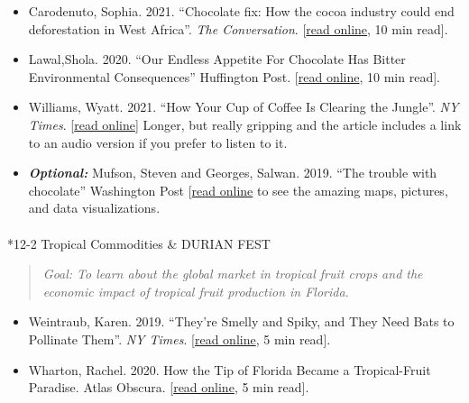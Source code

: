 \documentclass[
  10pt,
  letterpaper,
  oneside,
  open=any]{scrbook}
\makeatletter
\let\oldparagraph\paragraph
\renewcommand{\paragraph}{
    \@ifstar
      \xxxParagraphStar
      \xxxParagraphNoStar
  }
\newcommand{\xxxParagraphStar}[1]{\oldparagraph*{#1}\mbox{}}
\newcommand{\xxxParagraphNoStar}[1]{\oldparagraph{#1}\mbox{}}
\makeatother
\begin{document}
\begin{itemize}
\item
  Carodenuto, Sophia. 2021. ``Chocolate fix: How the cocoa industry
  could end deforestation in West Africa''. \emph{The Conversation}.
  {[}\href{https://theconversation.com/chocolate-fix-how-the-cocoa-industry-could-end-deforestation-in-west-africa-161953}{read
  online}, 10 min read{]}.
\item
  Lawal,Shola. 2020. ``Our Endless Appetite For Chocolate Has Bitter
  Environmental Consequences'' Huffington Post.
  {[}\href{https://tinyurl.com/y6curgmn}{read online}, 10 min read{]}.
\item
  Williams, Wyatt. 2021. ``How Your Cup of Coffee Is Clearing the
  Jungle''. \emph{NY Times}.
  {[}\href{https://www.nytimes.com/2021/08/11/magazine/indonesia-rainforest-coffee.html}{read
  online}{]} Longer, but really gripping and the article includes a link
  to an audio version if you prefer to listen to it.
\item
  \textbf{\emph{Optional:}} Mufson, Steven and Georges, Salwan. 2019.
  ``The trouble with chocolate'' Washington Post
  {[}\href{https://www.washingtonpost.com/graphics/2019/national/climate-environment/mars-chocolate-deforestation-climate-change-west-africa/}{read
  online} to see the amazing maps, pictures, and data visualizations.
\end{itemize}

\paragraph*{12-2 Tropical Commodities \& DURIAN
FEST}\label{tropical-commodities-durian-fest}

\begin{quote}
\emph{Goal: To learn about the global market in tropical fruit crops and
the economic impact of tropical fruit production in Florida.}
\end{quote}

\begin{itemize}
\item
  Weintraub, Karen. 2019. ``They're Smelly and Spiky, and They Need Bats
  to Pollinate Them''. \emph{NY Times}.
  {[}\href{https://www.nytimes.com/2019/12/04/science/bats-durians-indonesia.html}{read
  online}, 5 min read{]}.
\item
  Wharton, Rachel. 2020. How the Tip of Florida Became a Tropical-Fruit
  Paradise. Atlas Obscura.
  {[}\href{https://www.atlasobscura.com/articles/tropical-fruit-farms-in-united-states}{read
  online}, 5 min read{]}.
\end{itemize}
\end{document}
